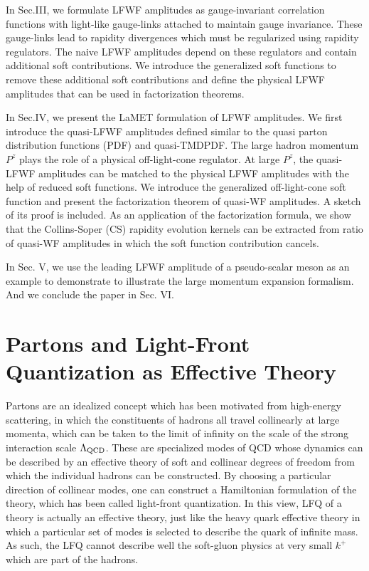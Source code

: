 \documentclass[twocolumn,superscriptaddress,longbibliography,10pt]{revtex4-1}
\begin{document}
In Sec.III, we formulate LFWF amplitudes as gauge-invariant correlation functions with light-like gauge-links attached to maintain gauge invariance. These gauge-links lead to rapidity divergences which must be regularized using rapidity regulators. The naive LFWF amplitudes depend on these regulators and contain additional soft contributions. We introduce the generalized soft functions to remove these additional soft contributions and define the physical LFWF amplitudes that can be used in factorization theorems.

In Sec.IV, we present the LaMET formulation of LFWF amplitudes. We first introduce the quasi-LFWF amplitudes defined similar to the quasi parton distribution functions (PDF) and quasi-TMDPDF. The large hadron momentum $P^z$ plays the role of a physical off-light-cone regulator.  At  large $P^z$,  the quasi-LFWF amplitudes can be matched to the physical LFWF amplitudes with  the help  of reduced  soft  functions.  We introduce the generalized off-light-cone soft function and present the factorization theorem of quasi-WF amplitudes. A  sketch  of  its  proof is included.   As  an  application of  the  factorization  formula,  we  show  that  the  Collins-Soper (CS) rapidity evolution kernels  can  be  extracted  from  ratio  of  quasi-WF amplitudes in which the soft function contribution cancels.

In Sec. V, we use the leading LFWF amplitude of a pseudo-scalar meson as an example to demonstrate to illustrate the large momentum expansion formalism. And we conclude the paper in Sec. VI.

\section{Partons and Light-Front Quantization as Effective Theory}

Partons are an idealized concept which has been motivated from high-energy scattering,
in which the constituents of hadrons all travel collinearly at large momenta,
which can be taken to the limit of infinity on the scale of the strong
interaction scale $\Lambda_{\rm QCD}$. These are specialized modes of QCD
whose dynamics can be described by an effective theory of soft and collinear
degrees of freedom from which the individual hadrons can be constructed.
By choosing a particular direction of collinear modes, one can
construct a Hamiltonian formulation of the theory, which has been
called light-front quantization. In this view, LFQ of a theory
is actually an effective theory, just like the heavy quark effective theory in which
a particular set of modes is selected to describe the quark of
infinite mass. As such, the LFQ cannot describe well the soft-gluon physics at very small $k^+$ which are
part of the hadrons.
\end{document}
